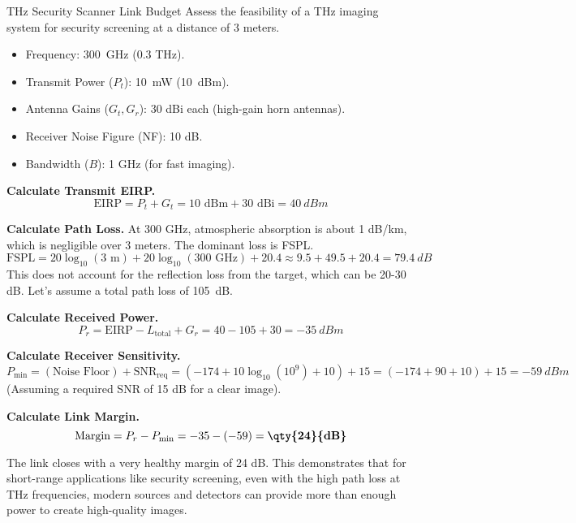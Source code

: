 \begin{workedexample}{THz Security Scanner Link Budget}
     Assess the feasibility of a THz imaging system for security screening at a distance of 3 meters.
    \begin{itemize}
        \item Frequency: \qty{300}{GHz} (0.3 THz).
        \item Transmit Power ($P_t$): \qty{10}{mW} (\qty{10}{dBm}).
        \item Antenna Gains ($G_t, G_r$): 30 dBi each (high-gain horn antennas).
        \item Receiver Noise Figure (NF): 10 dB.
        \item Bandwidth ($B$): 1 GHz (for fast imaging).
    \end{itemize}
    \begin{derivationsteps}
        \step \textbf{Calculate Transmit EIRP.}
        \[ \text{EIRP} = P_t + G_t = 10 \text{ dBm} + 30 \text{ dBi} = \qty{40}{dBm} \]
        
        \step \textbf{Calculate Path Loss.} At 300 GHz, atmospheric absorption is about 1 dB/km, which is negligible over 3 meters. The dominant loss is FSPL.
        \[ \text{FSPL} = 20\log_{10}(3 \text{ m}) + 20\log_{10}(300 \text{ GHz}) + 20.4 \approx 9.5 + 49.5 + 20.4 = \qty{79.4}{dB} \]
        This does not account for the reflection loss from the target, which can be 20-30 dB. Let's assume a total path loss of \qty{105}{dB}.
        
        \step \textbf{Calculate Received Power.}
        \[ P_r = \text{EIRP} - L_{\text{total}} + G_r = 40 - 105 + 30 = \qty{-35}{dBm} \]
        
        \step \textbf{Calculate Receiver Sensitivity.}
        \[ P_{\text{min}} = (\text{Noise Floor}) + \text{SNR}_{\text{req}} = (-174 + 10\log_{10}(10^9) + 10) + 15 = (-174+90+10) + 15 = \qty{-59}{dBm} \]
        (Assuming a required SNR of 15 dB for a clear image).
        
        \step \textbf{Calculate Link Margin.}
        \[ \text{Margin} = P_r - P_{\text{min}} = -35 - (-59) = \textbf{\qty{24}{dB}} \]
    \end{derivationsteps}
     The link closes with a very healthy margin of 24 dB. This demonstrates that for short-range applications like security screening, even with the high path loss at THz frequencies, modern sources and detectors can provide more than enough power to create high-quality images.
\end{workedexample}



